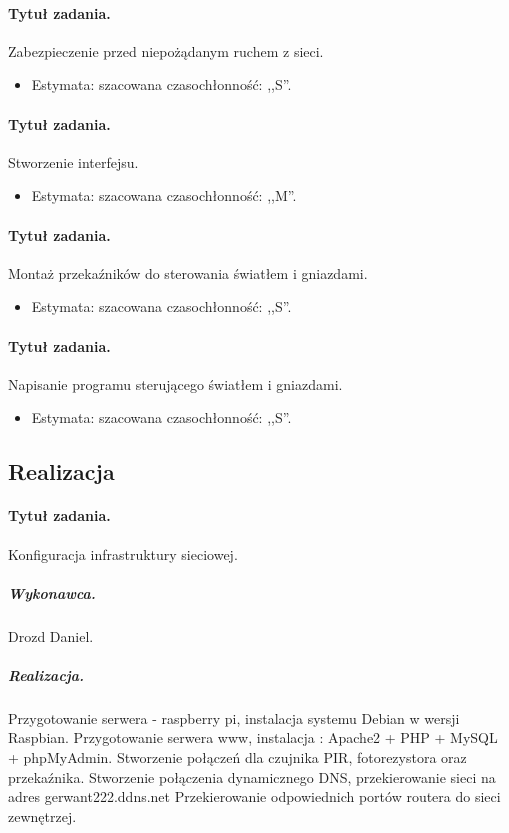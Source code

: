 	\paragraph{Tytuł zadania.} Zabezpieczenie przed niepożądanym ruchem z sieci.
	\begin{itemize}
		\item Estymata: szacowana czasochłonność: ,,S''.
	\end{itemize}
	
	\paragraph{Tytuł zadania.} Stworzenie interfejsu.
	\begin{itemize}
		\item Estymata: szacowana czasochłonność: ,,M''.
	\end{itemize}
	
	\paragraph{Tytuł zadania.} Montaż przekaźników do sterowania światłem i gniazdami.
	\begin{itemize}
		\item Estymata: szacowana czasochłonność: ,,S''.
	\end{itemize}
	
	\paragraph{Tytuł zadania.} Napisanie programu sterującego światłem i gniazdami.
	\begin{itemize}
		\item Estymata: szacowana czasochłonność: ,,S''.
	\end{itemize}


	\subsection{Realizacja}
	
	\paragraph{Tytuł zadania.} Konfiguracja infrastruktury sieciowej.
	\subparagraph{Wykonawca.} Drozd Daniel.
	\subparagraph{Realizacja.} Przygotowanie serwera - raspberry pi, instalacja systemu Debian w wersji Raspbian. Przygotowanie serwera www, instalacja : Apache2 + PHP + MySQL + phpMyAdmin.
  Stworzenie połączeń dla czujnika PIR, fotorezystora oraz przekaźnika. Stworzenie połączenia dynamicznego DNS, przekierowanie sieci na adres gerwant222.ddns.net
  Przekierowanie odpowiednich portów routera do sieci zewnętrzej.
 	   	   
